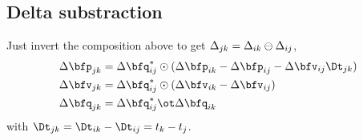 \subsection{Delta substraction}

Just invert the composition above to get  $\Delta_{jk} = \Delta_{ik}\ominus\Delta_{ij}$,
%
\begin{align} 
\begin{split}
\Dp_{jk} 
&= \Dq_{ij}^*\od(\Dp_{ik} - \Dp_{ij} - \Dv_{ij}\Dt_{jk}) \\
\Dv_{jk} 
&= \Dq_{ij}^*\od(\Dv_{ik} - \Dv_{ij}) \\
\Dq_{jk} 
&= \Dq_{ij}^*\ot\Dq_{ik} 
\end{split}
\end{align}
%
with $\Dt_{jk} = \Dt_{ik}-\Dt_{ij} = t_k-t_j$.

%



